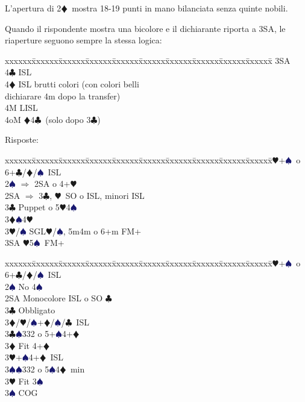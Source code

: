 \documentclass[a4paper,italian]{article}
\newcommand{\BC}{\textcolor{OliveGreen}{$\clubsuit$}}
\newcommand{\BD}{\textcolor{RedOrange}{$\vardiamondsuit$}}
\newcommand{\BH}{\textcolor{Red2}{$\varheartsuit${}}}
\newcommand{\BS}{\textcolor{MidnightBlue}{$\spadesuit${}}}
\newenvironment{bidtable}
{\begin{tabbing}

    xxxxxx\=xxxxxx\=xxxxxx\=xxxxxx\=xxxxxx\=xxxxxx\=xxxxxx\=xxxxxx\=xxxxxx\=xxxxxx\=\kill}
{\end{tabbing} }%
\newenvironment{sviluppi}
{\begin{tcolorbox}[colframe=azzurro,title=Sviluppi particolari]}
    {
\end{tcolorbox} }%
\begin{document}
\begin{multicols}{2}
    L'apertura di 2\BD\ mostra 18-19 punti in mano bilanciata senza quinte nobili.

    \begin{sviluppi}
        Quando il rispondente mostra una bicolore e il dichiarante riporta a 3SA, le riaperture seguono sempre la stessa logica:

        \begin{bidtable}\label{Riapertura3SA}
            3SA\+\\
            4\BC {} ISL\\
            4\BD {} ISL brutti colori (con colori belli\+\\ dichiarare 4m dopo la transfer)\-\\
            4M  LISL\\
            4oM \BD4\BC\ (solo dopo 3\BC)
        \end{bidtable}
    \end{sviluppi}
    Risposte:
    \begin{bidtable}
        2\BH {}+\BS\ o 6+\BC /\BD /\BS\ ISL\\
        2\BS \> $\Rightarrow$ 2SA o 4+\BH \\
        2SA \> $\Rightarrow$ 3\BC , \BH\ SO o ISL, minori ISL\\
        3\BC \> Puppet o 5\BH 4\BS \\
        3\BD {}\BS 4\BH \\
        3\BH/\BS \> SGL\BH /\BS , 5m4m o 6+m FM+\\
        3SA \BH 5\BS\ FM+
    \end{bidtable}
    \bigbreak
    \begin{bidtable}
        2\BH {}+\BS\ o 6+\BC /\BD /\BS\ ISL\+\\
        2\BS \> No 4\BS \+\\
        2SA \> Monocolore ISL o SO \BC \+\\
        3\BC \> Obbligato\+\\
        3\BD/\BH/\BS {}+\BD /\BS /\BC\ ISL\-\-\\
        3\BC {}\BS 332 o 5+\BS 4+\BD \+\\
        3\BD \> Fit 4+\BD \+\\
        3\BH {}+\BS 4+\BD\ ISL\\
        3\BS {}\BS 332 o 5\BS 4\BD\ min\-\\
        3\BH \> Fit 3\BS \+\\
        3\BS \> COG\\

\end{bidtable}
\end{multicols}
\end{document}
